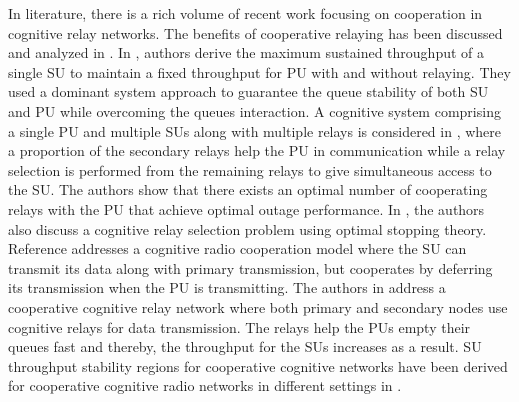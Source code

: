 \documentclass[journal,twocolumn]{IEEEtran}
\begin{document}
In literature, there is a rich volume of recent work focusing on cooperation in cognitive relay networks. The benefits of cooperative relaying has been discussed and analyzed in \cite{Simeone:2007,Papadimitriou14,Han:TCOM2012}. In \cite{Simeone:2007}, authors derive the maximum sustained throughput of a single SU to maintain a fixed throughput for PU with and without relaying. They used a dominant system approach to guarantee the queue stability of both SU and PU while overcoming the queues interaction. A cognitive system comprising a single PU and multiple SUs along with multiple relays is considered in \cite{Han:TCOM2012}, where a proportion of the secondary relays help the PU in communication while a relay selection is performed from the remaining relays to give simultaneous access to the SU. The authors show that there exists an optimal number of cooperating relays with the PU that achieve optimal outage performance. In \cite{Jing:2014}, the authors also discuss a cognitive relay selection problem using optimal stopping theory. Reference \cite{Neely:2012} addresses a cognitive radio cooperation model where the SU can transmit its data along with primary transmission, but cooperates by deferring its transmission when the PU is transmitting. The authors in \cite{El-sherif:2011} address a cooperative cognitive relay network where both primary and secondary nodes use cognitive relays for data transmission. The relays help the PUs empty their queues fast and thereby, the throughput for the SUs increases as a result. SU throughput stability regions for cooperative cognitive networks have been derived for cooperative cognitive radio networks in different settings in \cite{Simeone:2007,Krikidis:2010}.
\end{document}
